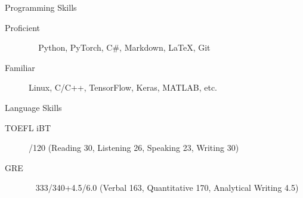 \documentclass{resume} %
\begin{document}

\begin{rSection}{Programming Skills}

\begin{description}
    \item[Proficient] \quad\,\,\,\,\, Python, PyTorch, C\#, Markdown, LaTeX, Git
    \item[Familiar] \quad\quad\quad Linux, C/C++, TensorFlow, Keras, MATLAB, etc.
    \newline
\end{description}

\end{rSection}

\begin{rSection}{Language Skills}

\begin{description}
    \item[TOEFL iBT] /120 (Reading 30, Listening 26, Speaking 23, Writing 30)
    \item[GRE] \quad\quad\quad\quad\,\,\, 333/340+4.5/6.0 (Verbal 163, Quantitative 170, Analytical Writing 4.5)
\end{description}

\end{rSection}
\end{document}

